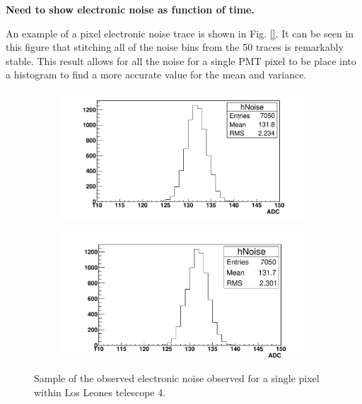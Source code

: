 \textbf{Need to show electronic noise as function of time.}

An example of a pixel electronic noise trace is shown in Fig. \ref{}. It can be seen in this figure that stitching all of the noise bins from the 50 traces is remarkably stable. This result allows for all the noise for a single PMT pixel to be place into a histogram to find a more accurate value for the mean and variance.

\begin{figure} %
\centering
\begin{subfigure}[b]{0.95\textwidth}
\includegraphics[width=\textwidth]{chapters/graphs/GainVarsMeas/LL_m04_2016-06-11/example_NoiseHist1.pdf}
\caption{}
\end{subfigure}
\vspace{3mm}
\begin{subfigure}[b]{0.95\textwidth}
\includegraphics[width=\textwidth]{chapters/graphs/GainVarsMeas/LL_m04_2016-06-11/example_NoiseHist2.pdf}
\caption{}
\end{subfigure}
\caption{Sample of the observed electronic noise observed for a single pixel within Los Leones telescope 4.}
\end{figure}

